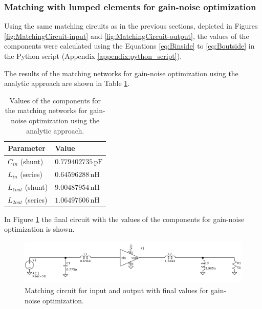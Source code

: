 \subsubsection{Matching with lumped elements for gain-noise optimization}

Using the same matching circuits as in the previous sections, depicted in Figures \ref{fig:MatchingCircuit-input} and \ref{fig:MatchingCircuit-output}, the values of the components were calculated using the Equations \ref{eq:Binside} to \ref{eq:Boutside} in the Python script (Appendix \ref{appendix:python_script}).

The results of the matching networks for gain-noise optimization using the analytic approach are shown in Table \ref{tab:MatchingValues-gain-noise}.

\begin{table}[H]
    \centering
    \caption{Values of the components for the matching networks for gain-noise optimization using the analytic approach.}
    \begin{tabularx}{\textwidth}{>{\centering\arraybackslash}X >{\centering\arraybackslash}X}
        \toprule
        \textbf{Parameter} & \textbf{Value} \\
        \midrule
        $C_{in}$ \quad (shunt)    & $0.779402735\,\si{\pico\farad}$ \\
        \midrule
        $L_{in}$  \quad(series)   & $0.64596288\,\si{\nano\henry}$\\
        \midrule
        $L_{1out}$ \quad (shunt)   & $9.00487954\,\si{\nano\henry}$ \\
        \midrule
        $L_{2out}$ \quad (series)   & $1.06497606\,\si{\nano\henry}$\\
        \bottomrule
    \end{tabularx}
    \label{tab:MatchingValues-gain-noise}
\end{table}

In Figure \ref{fig:MatchingCircuit-gain-noise} the final circuit with the values of the components for gain-noise optimization is shown.

\begin{figure}[H]
    \centering
    \includegraphics[width=1\textwidth]{Images/gain-noise-final-circuit.png}
    \caption{Matching circuit for input and output with final values for gain-noise optimization.}
    \label{fig:MatchingCircuit-gain-noise}
\end{figure}

